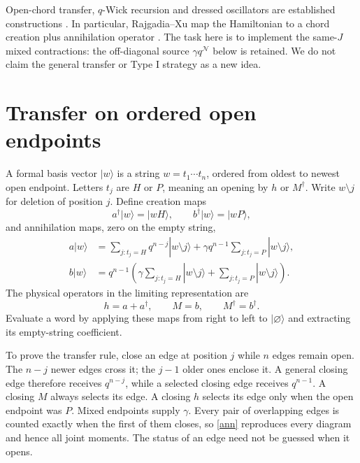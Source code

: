 \documentclass[11pt]{article}
\begin{document}
Open-chord transfer, $q$-Wick recursion and dressed oscillators
are established constructions \cite{EP,RX,BNR}. In particular,
Rajgadia--Xu map the Hamiltonian to a chord creation plus
annihilation operator \cite[Sec.~3.2]{RX}. The task here is to
implement the same-$J$ mixed contractions: the off-diagonal
source $\gamma q^{\mathcal N}$ below is retained. We do not
claim the general transfer or Type I strategy as a new idea.

\section{Transfer on ordered open endpoints}
A formal basis vector $|w\rangle$ is a string
$w=t_1\cdots t_n$, ordered from oldest to newest open endpoint.
Letters $t_j$ are $H$ or $P$, meaning an opening by $h$ or
$M^\dagger$. Write $w\setminus j$ for deletion of position $j$.
Define creation maps
\begin{equation}
 a^\dagger|w\rangle=|wH\rangle,\qquad
 b^\dagger|w\rangle=|wP\rangle,
\end{equation}
and annihilation maps, zero on the empty string,
\begin{align}\label{ann}
 a|w\rangle&=\sum_{j:t_j=H}q^{n-j}|w\setminus j\rangle
       +\gamma q^{n-1}\sum_{j:t_j=P}|w\setminus j\rangle,\\
 b|w\rangle&=q^{n-1}\left(
       \gamma\sum_{j:t_j=H}|w\setminus j\rangle
       +\sum_{j:t_j=P}|w\setminus j\rangle\right).
\end{align}
The physical operators in the limiting representation are
\begin{equation}\label{physical}
 h=a+a^\dagger,\qquad M=b,\qquad M^\dagger=b^\dagger.
\end{equation}
Evaluate a word by applying these maps from right to left to
$|\varnothing\rangle$ and extracting its empty-string coefficient.

To prove the transfer rule, close an edge at position $j$ while
$n$ edges remain open. The $n-j$ newer edges cross it; the $j-1$
older ones enclose it. A general closing edge therefore receives
$q^{n-j}$, while a selected closing edge receives $q^{n-1}$.
A closing $M$ always selects its edge. A closing $h$ selects its
edge only when the open endpoint was $P$. Mixed endpoints supply
$\gamma$. Every pair of overlapping edges is counted exactly
when the first of them closes, so \eqref{ann} reproduces every
diagram and hence all joint moments. The status of an edge need
not be guessed when it opens.
\end{document}
